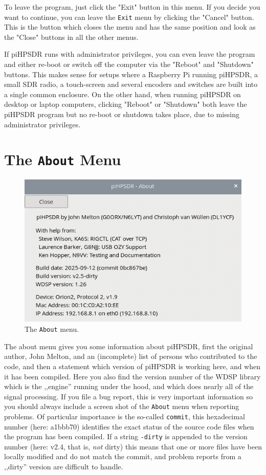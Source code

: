 \documentclass[12pt]{book}
\def\rett#1{\texttt{\color{red}#1}}
\def\bltt#1{\texttt{\color{blue}#1}}
\def\pH{pi\-HPSDR\xspace}
\begin{document}
To leave the program, just click the
"Exit" button in this menu. If you decide you want to continue, you can leave the \bltt{Exit}
menu by clicking the "Cancel" button. This is the button which closes the menu and has
the same position and look as the "Close" buttons in all the other menus.

If \pH runs with administrator privileges, you can even leave the program and either re-boot
or switch off the computer via the "Reboot" and "Shutdown" buttons. This makes sense for setups
where a Raspberry Pi running \pH, a small SDR radio, a touch-screen and several encoders
and switches are built into a single common enclosure. On the other hand, when running
\pH on desktop or laptop computers, clicking "Reboot" or "Shutdown" both leave the \pH
program but no re-boot or shutdown takes place, due to missing administrator privileges.

\clearpage
\section{The \texttt{About} Menu}

\begin{figure}[ht]
\center
\includegraphics[scale=0.45]{AboutMenu.png}
\caption{The \bltt{About} menu.}
\end{figure}

The about menu gives you some information about \pH, first the original author,
John Melton,
and an (incomplete) list
of persons who contributed to the code, and then a statement which version of \pH
is working here, and when it has been compiled. Here you also find the version number of the WDSP
library which is the ,,engine''
running under the hood, and which does nearly all of the signal processing. If you file a bug report,
this is very important information so you should always include a screen shot of the \bltt{About}
menu when reporting problems. Of particular importance is the so-called \rett{commit},
this hexadecimal number (here: a1bbb70) identifies the exact status of the source code files
when the program has been compiled. If a string \texttt{-dirty} is appended to the version number
(here: v2.4, that is, \textit{not} dirty) this means that one or more files have been locally  modified
and do not match the commit, and problem reports from a ,,dirty'' version are difficult to handle.
\end{document}
